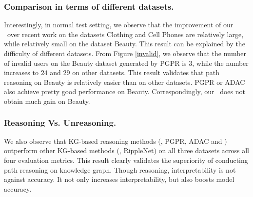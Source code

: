 %

\subsubsection{\textbf{Comparison in terms of different datasets.}}
 Interestingly, in normal test setting, we observe that the improvement of our \tkgrec\ over recent work on the datasets Clothing and Cell Phones are relatively large, while relatively small on the dataset Beauty. This result can be explained by the difficulty of different datasets. From Figure \ref{invalid}, we observe that the number of invalid users on the Beauty dataset generated by PGPR is $3$, while the number increases to $24$ and $29$ on other datasets. This result validates that path reasoning on Beauty is relatively easier than on other datasets. PGPR or ADAC also achieve pretty good performance on Beauty. Correspondingly, our \tkgrec\ does not obtain much gain on Beauty.

\subsubsection{\textbf{Reasoning Vs. Unreasoning.}}
 We also observe that KG-based reasoning methods (\ie, PGPR, ADAC and \tkgrec) outperform other KG-based methods (\ie, RippleNet) on all three datasets across all four evaluation metrics. This result clearly validates the superiority of conducting path reasoning on knowledge graph. Though reasoning, interpretability is not against accuracy. It not only increases interpretability, but also boosts model accuracy.
 
